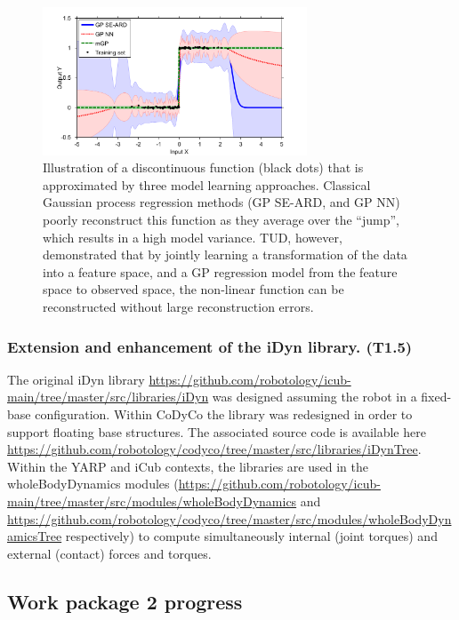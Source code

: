 \documentclass[12pt,a4paper,twoside]{article}
\begin{document}
\begin{figure}
\centering
\includegraphics[width=0.7\textwidth]{./images/AAAI2014_0.pdf}
 \caption{Illustration of a discontinuous function (black dots) that is approximated by three 
 model learning approaches. Classical Gaussian process regression methods (GP SE-ARD, and GP NN) 
 poorly reconstruct this function as they average over the ``jump'', which results in a high model variance. 
 TUD, however, demonstrated that by jointly learning a transformation of the data into a feature space, 
 and a GP regression model from the feature space to observed space, the non-linear function 
 can be reconstructed without large reconstruction errors. 
}
\label{fig:example_discontinuities}
\end{figure}

\subsubsection{Extension and enhancement of the iDyn library. (T1.5)}

The original iDyn library \url{https://github.com/robotology/icub-main/tree/master/src/libraries/iDyn} was designed assuming the robot in a fixed-base configuration. Within CoDyCo the library was redesigned in order to support floating base structures. The associated source code is available here \url{https://github.com/robotology/codyco/tree/master/src/libraries/iDynTree}. Within the YARP and iCub contexts, the libraries are used in the wholeBodyDynamics modules (\url{https://github.com/robotology/icub-main/tree/master/src/modules/wholeBodyDynamics} and \url{https://github.com/robotology/codyco/tree/master/src/modules/wholeBodyDynamicsTree} respectively) to compute simultaneously internal (joint torques) and external (contact) forces and torques. 

\subsection{Work package 2 progress}
\end{document}
